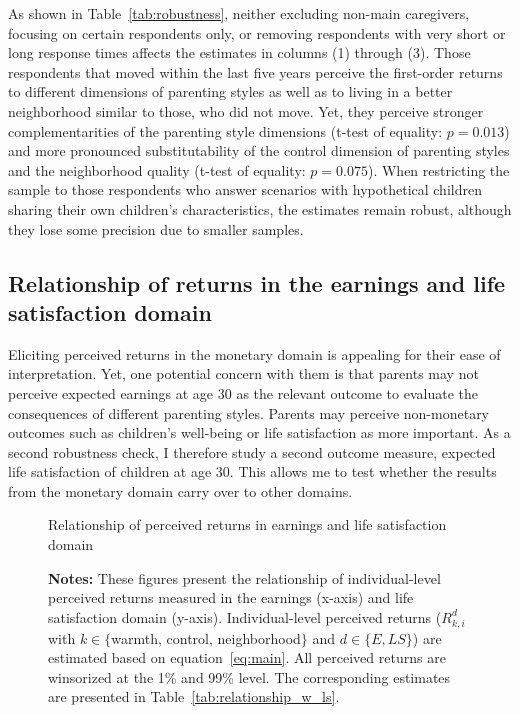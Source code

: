 \documentclass[12pt, a4paper, english]{article}
\begin{document}
As shown in Table~\ref{tab:robustness}, neither excluding non-main caregivers, focusing on certain respondents only, or removing respondents with very short or long response times affects the estimates in columns (1) through (3). Those respondents that moved within the last five years perceive the first-order returns to different dimensions of parenting styles as well as to living in a better neighborhood similar to those, who did not move. Yet, they perceive stronger complementarities of the parenting style dimensions (t-test of equality: $p=0.013$) and more pronounced substitutability of the control dimension of parenting styles and the neighborhood quality (t-test of equality: $p=0.075$). When restricting the sample to those respondents who answer scenarios with hypothetical children sharing their own children's characteristics, the estimates remain robust, although they lose some precision due to smaller samples.

\subsection{Relationship of returns in the earnings and life satisfaction domain}\label{sec:relationship_w_ls}
Eliciting perceived returns in the monetary domain is appealing for their ease of interpretation. Yet, one potential concern with them is that parents may not perceive expected earnings at age 30 as the relevant outcome to evaluate the consequences of different parenting styles. Parents may perceive non-monetary outcomes such as children's well-being or life satisfaction as more important. As a second robustness check, I therefore study a second outcome measure, expected life satisfaction of children at age 30. This allows me to test whether the results from the monetary domain carry over to other domains. 

\begin{figure}[h!]\centering 
    \caption{Relationship of perceived returns in earnings and life satisfaction domain}\label{fig:relationship_w_ls}
    \vspace{-.1cm}
    \caption*{\footnotesize \textbf{Notes:} These figures present the relationship of individual-level perceived returns measured in the earnings (x-axis) and life satisfaction domain (y-axis). Individual-level perceived returns ($R_{k,i}^d$ with $k\in\{$warmth, control, neighborhood$\}$ and $d\in\{E,LS\}$) are estimated based on equation~\eqref{eq:main}. All perceived returns are winsorized at the 1\% and 99\% level. The corresponding estimates are presented in Table~\ref{tab:relationship_w_ls}.}
  \end{figure}
\end{document}
